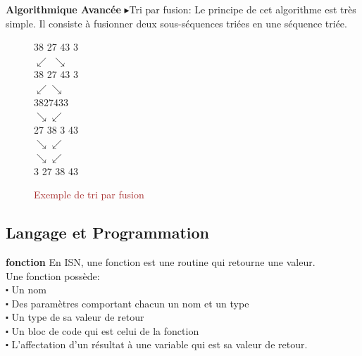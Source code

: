 \documentclass[a4paper, 12pt]{beamer}
\begin{document}
\begin{frame}
		\begin{block}{\textbf{Algorithmique Avancée}}
$\blacktriangleright$Tri par fusion:
    Le principe de cet algorithme est très simple. Il consiste à fusionner deux sous-séquences triées en une séquence triée.\\
   \begin{figure}[!h]
  \centering
    \begin{center}
	38		27		43		3\\
$\swarrow$  $\searrow$\\
	38		27	\hspace{1cm}	43		3\\
$\swarrow$\hspace{2cm}$\searrow$\\
38\hspace{0.5cm}27\hspace{2.5cm}43\hspace{0.5cm}3\\
$\searrow$\hspace{2.5cm}$\swarrow$\\
27		38 \hspace{1cm}	3 	43\\
$\searrow$\hspace{1cm}$\swarrow$\\
$\searrow$\hspace{0.1cm}$\swarrow$\\
3	27	38		43\\
	  \end{center}
	  \caption{\textcolor{brown}{Exemple de tri par fusion}}
  \end{figure}
  \end{block}
\end{frame}
	
\subsection{Langage et Programmation}
	\begin{frame}
		\begin{block}{\textbf{fonction}}
		En ISN, une fonction est une routine qui retourne une valeur.\\
Une fonction possède:\\
$\centerdot$ Un nom\\
$\centerdot$ Des paramètres comportant chacun un nom et un type\\
$\centerdot$ Un type de sa valeur de retour\\
$\centerdot$ Un bloc de code qui est celui de la fonction\\
$\centerdot$ L'affectation d'un résultat à une variable qui est sa valeur de retour.
		\end{block}
\end{frame}
\end{document}

